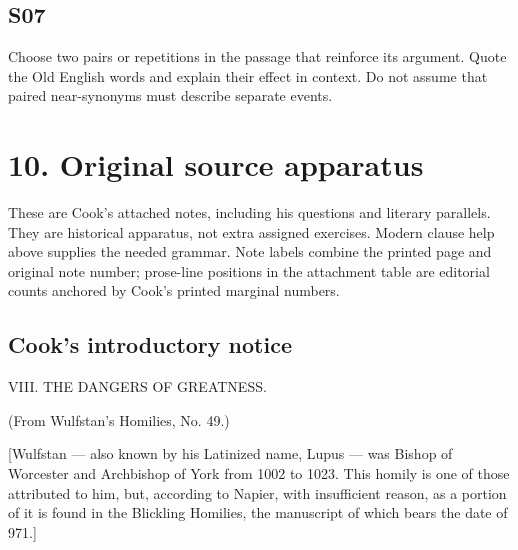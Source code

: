 \par\begin{minipage}{\linewidth}\raggedright
\subsection*{S07}

Choose two pairs or repetitions in the passage that reinforce its argument. Quote the Old English words and explain their effect in context. Do not assume that paired near-synonyms must describe separate events.

\end{minipage}\par\addvspace{4pt}

\section*{10. Original source apparatus}

\begingroup\fontsize{10}{12.8}\selectfont
\setlength{\parskip}{1.5pt}
These are Cook’s attached notes, including his questions and literary parallels. They are historical apparatus, not extra assigned exercises. Modern clause help above supplies the needed grammar. Note labels combine the printed page and original note number; prose-line positions in the attachment table are editorial counts anchored by Cook’s printed marginal numbers.

\subsection*{Cook’s introductory notice}

VIII. THE DANGERS OF GREATNESS.

(From Wulfstan’s Homilies, No. 49.)

[Wulfstan — also known by his Latinized name, Lupus — was Bishop of Worcester and Archbishop of York from 1002 to 1023. This homily is one of those attributed to him, but, according to Napier, with insufficient reason, as a portion of it is found in the Blickling Homilies, the manuscript of which bears the date of 971.]

